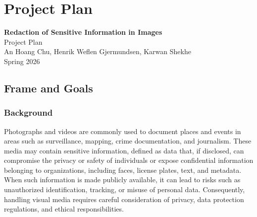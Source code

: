 
\cleardoublepage
\chapter{Project Plan}
\label{app:project-plan}

\begingroup
\setlength{\parindent}{0pt}
\setlength{\parskip}{0.8em}
\makeatletter
{}%
\makeatother
\sloppy

\begin{center}
    {\Large\textbf{Redaction of Sensitive Information in Images}}\\[0.3em]
    {\large Project Plan}\\[0.7em]
    An Hoang Chu, Henrik Weflen Gjermundsen, Karwan Shekhe\\[0.3em]
    Spring 2026
\end{center}

\section{Frame and Goals}

\subsection{Background}

Photographs and videos are commonly used to document places and events in areas such as surveillance, mapping, crime documentation, and journalism. These media may contain sensitive information, defined as data that, if disclosed, can compromise the privacy or safety of individuals or expose confidential information belonging to organizations, including faces, license plates, text, and metadata. When such information is made publicly available, it can lead to risks such as unauthorized identification, tracking, or misuse of personal data. Consequently, handling visual media requires careful consideration of privacy, data protection regulations, and ethical responsibilities.

